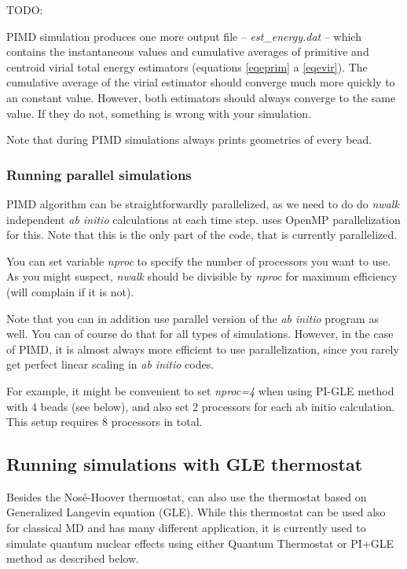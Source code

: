 TODO:

PIMD simulation produces one more output file -- \textit{est\_energy.dat} -- which contains the instantaneous values and cumulative averages of primitive and centroid virial total energy estimators (equations \ref{eqeprim} a \ref{eqevir}). The cumulative average of the virial estimator should converge much more quickly to an constant value. However, both estimators should always converge to the same value. If they do not, something is wrong with your simulation.

Note that during PIMD simulations \abin always prints geometries of every bead.

\subsubsection{Running parallel simulations}

PIMD algorithm can be straightforwardly parallelized, as we need to do do \textit{nwalk} independent \textit{ab initio} calculations at each time step.
\abin uses OpenMP parallelization for this. Note that this is the only part of the code, that is currently parallelized.

You can set variable \textit{nproc} to specify the number of processors you want to use. As you might suspect, \textit{nwalk} should be divisible by \textit{nproc} for maximum efficiency (\abin will complain if it is not).

Note that you can in addition use parallel version of the \textit{ab initio} program as well. You can of course do that for all types of simulations. However, in the case of PIMD, it is almost always more efficient to use \abin parallelization, since you rarely get perfect linear scaling in \textit{ab initio} codes.

For example, it might be convenient to set \textit{nproc=4} when using PI-GLE method with 4 beads (see below), and also set 2 processors for each ab initio calculation. This setup requires 8 processors in total.

\subsection{Running simulations with GLE thermostat}
Besides the Nosé-Hoover thermostat, \abin can also use the thermostat based on Generalized Langevin equation (GLE). While this thermostat can be used also for classical MD and has many different application, it is currently used to simulate quantum nuclear effects using either Quantum Thermostat or PI+GLE method as described below.

